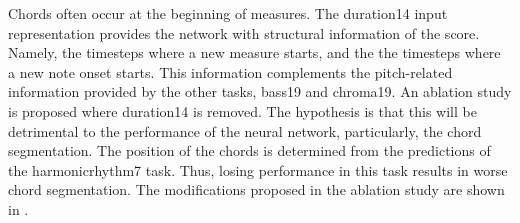 
Chords often occur at the beginning of measures. The
\gls{duration14} input representation provides the network
with structural information of the score. Namely, the
timesteps where a new measure starts, and the the timesteps
where a new note onset starts. This information complements
the pitch-related information provided by the other tasks,
\gls{bass19} and \gls{chroma19}. An ablation study is
proposed where \gls{duration14} is removed. The hypothesis
is that this will be detrimental to the performance of the
neural network, particularly, the chord segmentation. The
position of the chords is determined from the predictions of
the \gls{harmonicrhythm7} task. Thus, losing performance in
this task results in worse chord segmentation. The
modifications proposed in the ablation study are shown in
.

